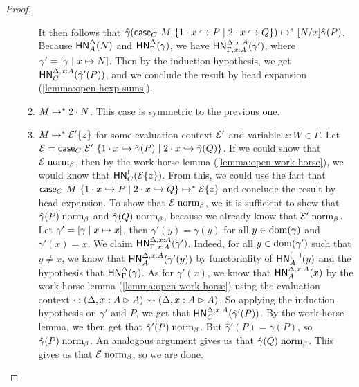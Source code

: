 \documentclass{article}
\begin{document}
\begin{proof}
\begin{itemize}
\begin{enumerate}
      It then follows that $\hat\gamma(\mathsf{case}_{C}\ M\ \{1\cdot x \hookrightarrow P \mid 2\cdot x \hookrightarrow Q\}) \mapsto^* [N/x]\hat\gamma(P)$.
      Because $\mathsf{HN}^{\Delta}_{A}(N)$ and $\mathsf{HN}^{\Delta}_{\Gamma}(\gamma)$, we have $\mathsf{HN}^{\Delta,x:A}_{\Gamma,x:A}(\gamma')$, where $\gamma' = [\gamma \mid x \mapsto N]$.
      Then by the induction hypothesis, we get $\mathsf{HN}^{\Delta,x:A}_{C}(\hat\gamma'(P))$, and we conclude the result by head expansion (\cref{lemma:open-hexp-sums}).
    \item $M \mapsto^* 2\cdot N$. This case is symmetric to the previous one.
    \item $M \mapsto^* \mathcal{E}'\{z\}$ for some evaluation context $\mathcal{E}'$ and variable $z:W \in \Gamma$.
      Let $\mathcal{E} = \mathsf{case}_{C}\ \mathcal{E}'\ \{1\cdot x \hookrightarrow \hat\gamma(P) \mid 2\cdot x \hookrightarrow \hat\gamma(Q)\}$.
      If we could show that $\mathcal{E} \mathrel{\text{norm}_\beta}$, then by the work-horse lemma (\cref{lemma:open-work-horse}), we would know that $\mathsf{HN}^{\Gamma}_{C}(\mathcal{E}\{z\})$.
      From this, we could use the fact that $\mathsf{case}_{C}\ M\ \{1\cdot x \hookrightarrow P \mid 2\cdot x \hookrightarrow Q\} \mapsto^* \mathcal{E}\{z\}$ and conclude the result by head expansion.
      To show that $\mathcal{E} \mathrel{\text{norm}_\beta}$, we it is sufficient to show that $\hat\gamma(P) \mathrel{\text{norm}_\beta}$ and $\hat\gamma(Q) \mathrel{\text{norm}_\beta}$, because we already know that $\mathcal{E}' \mathrel{\text{norm}_\beta}$.
      Let $\gamma' = [\gamma \mid x \mapsto x]$, then $\gamma'(y) = \gamma(y)$ for all $y \in \operatorname{dom}(\gamma)$ and $\gamma'(x) = x$.
      We claim $\mathsf{HN}^{\Delta,x:A}_{\Gamma,x:A}(\gamma')$.
      Indeed, for all $y \in \operatorname{dom}(\gamma')$ such that $y \neq x$, we know that $\mathsf{HN}^{\Delta,x:A}_{A}(\gamma'(y))$ by functoriality of $\mathsf{HN}^{({-})}_{A}(y)$ and the hypothesis that $\mathsf{HN}^{\Delta}_{\Gamma}(\gamma)$.
      As for $\gamma'(x)$, we know that $\mathsf{HN}^{\Delta,x:A}_{A}(x)$ by the work-horse lemma (\cref{lemma:open-work-horse}) using the evaluation context $\cdot : (\Delta,x:A \rhd A) \leadsto (\Delta,x:A \rhd A)$.
      So applying the induction hypothesis on $\gamma'$ and $P$, we get that $\mathsf{HN}^{\Delta,x:A}_{C}(\hat\gamma'(P))$.
      By the work-horse lemma, we then get that $\hat\gamma'(P) \mathrel{\text{norm}_\beta}$.
      But $\hat\gamma'(P) = \hat\gamma(P)$, so $\hat\gamma(P) \mathrel{\text{norm}_\beta}$.
      An analogous argument gives us that $\hat\gamma(Q) \mathrel{\text{norm}_\beta}$.
      This gives us that $\mathcal{E} \mathrel{\text{norm}_\beta}$, so we are done.\qedhere
    \end{enumerate}
  \end{itemize}
\end{proof}



\end{document}
